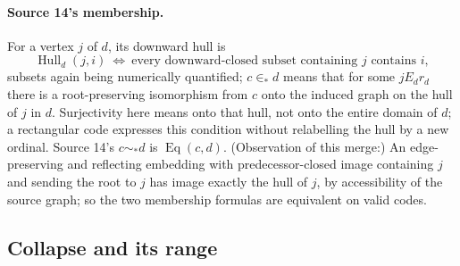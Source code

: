 \documentclass[11pt,letterpaper]{article}
\theoremstyle{definition}
\theoremstyle{remark}
\newcommand{\Eqc}{\operatorname{Eq}}
\begin{document}
\paragraph{Source 14's membership.} For a vertex $j$ of $d$, its downward hull is
\[
 \operatorname{Hull}_d(j,i)\ \Longleftrightarrow\ \text{every downward-closed
 subset containing $j$ contains $i$},
\]
subsets again being numerically quantified; $c\in_* d$ means that for some
$jE_dr_d$ there is a root-preserving isomorphism from $c$ onto the induced graph
on the hull of $j$ in $d$. Surjectivity here means onto that hull, not onto the
entire domain of $d$; a rectangular code expresses this condition without
relabelling the hull by a new ordinal. Source 14's $c\sim_*d$ is $\Eqc(c,d)$. (Observation of this merge:) An
edge-preserving and reflecting embedding with predecessor-closed image containing
$j$ and sending the root to $j$ has image exactly the hull of $j$, by
accessibility of the source graph; so the two membership formulas are equivalent
on valid codes.

\subsection{Collapse and its range}
\end{document}
